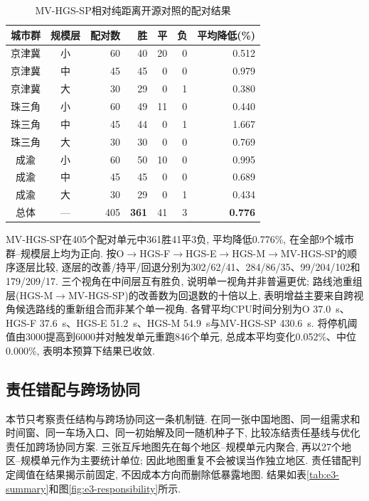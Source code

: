\documentclass{setp-new}
\newcommand{\setptabsetup}{\fontsize{9pt}{10.5pt}\selectfont\renewcommand{\arraystretch}{0.95}\setlength{\tabcolsep}{2.2pt}\setlength{\aboverulesep}{0.4pt}\setlength{\belowrulesep}{0.4pt}\hbadness=10000}
\begin{document}
\begin{table}[H]
\centering
\caption{MV-HGS-SP相对纯距离开源对照的配对结果}
\label{tab:mv-vs-o}
\setptabsetup
\begin{tabular*}{\linewidth}{@{\extracolsep{\fill}}ccrrrrr@{}}
\toprule
城市群 & 规模层 & 配对数 & 胜 & 平 & 负 & 平均降低(\%)\\
\midrule
京津冀 & 小 & 60 & 40 & 20 & 0 & 0.512 \\
京津冀 & 中 & 45 & 45 & 0 & 0 & 0.979 \\
京津冀 & 大 & 30 & 29 & 0 & 1 & 0.380 \\
珠三角 & 小 & 60 & 49 & 11 & 0 & 0.440 \\
珠三角 & 中 & 45 & 44 & 0 & 1 & 1.667 \\
珠三角 & 大 & 30 & 30 & 0 & 0 & 0.769 \\
成渝 & 小 & 60 & 50 & 10 & 0 & 0.995 \\
成渝 & 中 & 45 & 45 & 0 & 0 & 0.689 \\
成渝 & 大 & 30 & 29 & 0 & 1 & 0.434 \\
\midrule
总体 & --- & 405 & \textbf{361} & 41 & 3 & \textbf{0.776} \\
\bottomrule
\end{tabular*}
\end{table}

MV-HGS-SP在405个配对单元中361胜41平3负, 平均降低0.776\%,
在全部9个城市群--规模层上均为正向.
按O$\to$HGS-F$\to$HGS-E$\to$HGS-M$\to$MV-HGS-SP的顺序逐层比较,
逐层的改善/持平/回退分别为302/62/41、284/86/35、99/204/102和179/209/17.
三个视角在中间层互有胜负, 说明单一视角并非普遍更优;
路线池重组层(HGS-M$\to$MV-HGS-SP)的改善数为回退数的十倍以上,
表明增益主要来自跨视角候选路线的重新组合而非某个单一视角.
各臂平均CPU时间分别为O 37.0~s、HGS-F 37.6~s、HGS-E 51.2~s、HGS-M 54.9~s与MV-HGS-SP 430.6~s.
将停机阈值由3000提高到6000并对触发单元重跑846个单元,
总成本平均变化0.052\%、中位0.000\%, 表明本预算下结果已收敛.


\subsection{责任错配与跨场协同}

本节只考察责任结构与跨场协同这一条机制链.
在同一张中国地图、同一组需求和时间窗、同一车场入口、同一初始解及同一随机种子下,
比较冻结责任基线与优化责任加跨场协同方案.
三张互斥地图先在每个地区--规模单元内聚合,
再以27个地区--规模单元作为主要统计单位;
因此地图重复不会被误当作独立地区.
责任错配判定阈值在结果揭示前固定,
不因成本方向而删除低暴露地图.
结果如表\ref{tab:e3-summary}和图\ref{fig:e3-responsibility}所示.
\end{document}
